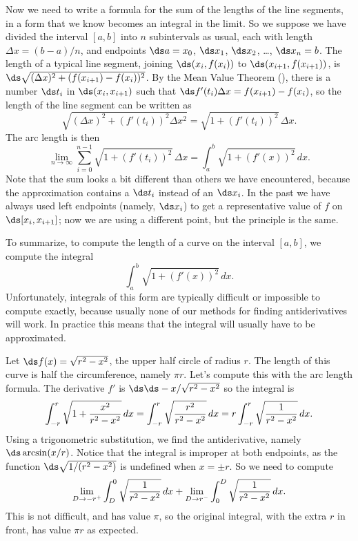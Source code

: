 Now we need to write a formula for the sum of the lengths of the line
segments, in a form that we know becomes an integral in the limit.  So
we suppose we have divided the interval $[a,b]$ into $n$ subintervals
as usual, each with length $\Delta x =(b-a)/n$, and endpoints $\ds
a=x_0$, $\ds x_1$, $\ds x_2$, \dots, $\ds x_n=b$.  The length of a
typical line segment, joining $\ds (x_i,f(x_i))$ to $\ds
(x_{i+1},f(x_{i+1}))$, is $\ds\sqrt{(\Delta x )^2
  +(f(x_{i+1})-f(x_i))^2}$.  By the Mean Value Theorem
(), there is a number $\ds t_i$ in $\ds (x_i,x_{i+1})$
such that $\ds f'(t_i)\Delta x=f(x_{i+1})-f(x_i)$, so the length of
the line segment can be written as
$$
  \sqrt{(\Delta x)^2 + (f'(t_i))^2\Delta x^2}=
  \sqrt{1+(f'(t_i))^2}\,\Delta x.
$$
The arc length is then
$$
  \lim_{n\to\infty}\sum_{i=0}^{n-1} \sqrt{1+(f'(t_i))^2}\,\Delta x=
  \int_a^b \sqrt{1+(f'(x))^2}\,dx.
$$
Note that the sum looks a bit different than others we have
encountered, because the approximation contains a $\ds t_i$ instead of an
$\ds x_i$. In the past we have always used left endpoints (namely, $\ds x_i$)
to get a representative value of $f$ on $\ds [x_i,x_{i+1}]$; now we are
using a different point, but the principle is the same.

To summarize, to compute the length of a curve on the interval
$[a,b]$, we compute the integral
$$\int_a^b \sqrt{1+(f'(x))^2}\,dx.$$ 
Unfortunately, integrals of this form are typically difficult or
impossible to compute exactly, because usually none of our methods for
finding antiderivatives will work. In practice this means that the
integral will usually have to be approximated.


\begin{example} Let $\ds f(x) = \sqrt{r^2-x^2}$, the upper half circle of radius
$r$. The length of this curve is half the circumference, namely $\pi
r$. Let's compute this with the arc length formula.
The derivative $f'$ is $\ds \ds -x/\sqrt{r^2-x^2}$ so the integral is
$$
  \int_{-r}^r \sqrt{1+{x^2\over r^2-x^2}}\,dx
  =\int_{-r}^r \sqrt{r^2\over r^2-x^2}\,dx
  =r\int_{-r}^r \sqrt{1\over r^2-x^2}\,dx.
$$
Using a trigonometric substitution, we find the antiderivative, namely
$\ds \arcsin(x/r)$. Notice that the integral is improper at both
endpoints, as the function $\ds \sqrt{1/(r^2-x^2)}$ is undefined when
$x=\pm r$. So we need to compute
$$
  \lim_{D\to-r^+}\int_D^0  \sqrt{1\over r^2-x^2}\,dx +
  \lim_{D\to r^-}\int_0^D  \sqrt{1\over r^2-x^2}\,dx.
$$
This is not difficult, and has value $\pi$, so the original integral,
with the extra $r$ in front, has value $\pi r$ as expected.
\end{example}


